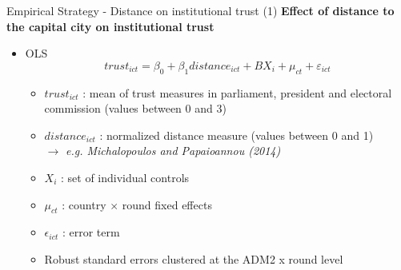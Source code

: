 \documentclass[10pt]{beamer}
\begin{document}
\begin{frame}{Empirical Strategy - Distance on institutional trust (1)}
    \centering \textbf{Effect of distance to the capital city on institutional trust}\vspace{1em}
    \begin{itemize}
        \item OLS
        \begin{equation}
        trust_{ict} = \beta_{0} + \beta_{1}distance_{ict} + BX_{i} + \mu_{ct} + \varepsilon_{ict}
        \end{equation}
        \begin{itemize}
            \item $trust_{ict}$ : mean of trust measures in parliament, president and electoral commission (values between 0 and 3)\vfill
            \item $distance_{ict}$ : normalized distance measure (values between 0 and 1)\\
            $\rightarrow{}$ \textit{e.g. Michalopoulos and Papaioannou (2014)}\vfill
            \item $X_i$ : set of individual controls\vfill
            \item $\mu_{ct}$ : country $\times$ round fixed effects\vfill
            \item $\epsilon_{ict}$ : error term\vfill
            \item Robust standard errors clustered at the ADM2 x round level
        \end{itemize}
    \end{itemize}
\end{frame}
\end{document}
